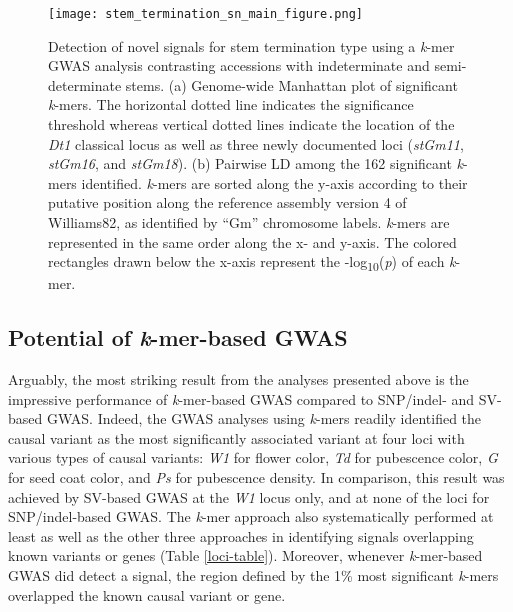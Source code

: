 \begin{figure}
	\centering
	\texttt{[image: stem\_termination\_sn\_main\_figure.png]}
	\caption[Detection of novel signals for stem termination type
	using a \textit{k}-mer GWAS analysis contrasting accessions with
	indeterminate and semi-determinate stems]{Detection of novel signals for stem termination type
	using a \textit{k}-mer GWAS analysis contrasting accessions with
	indeterminate and semi-determinate stems.
	(a) Genome-wide Manhattan plot of significant \textit{k}-mers.
	The horizontal dotted line indicates the significance threshold
	whereas vertical dotted lines indicate the location of the \textit{Dt1}
	classical locus as well as three newly documented loci (\textit{stGm11},
	\textit{stGm16}, and \textit{stGm18}).
	(b) Pairwise LD among the 162 significant \textit{k}-mers identified.
	\textit{k}-mers are sorted along the y-axis according to their
	putative position along the reference assembly version 4 of Williams82,
	as identified by ``Gm'' chromosome labels. \textit{k}-mers are
	represented in the same order along the x- and y-axis. The colored
	rectangles drawn below the x-axis represent the
	-log\textsubscript{10}(\textit{p}) of each \textit{k}-mer.}
	\label{stem-termination-main-figure}
\end{figure}

\subsection{Potential of \emph{k}-mer-based GWAS}
\label{sv-gwas-potential-kmers}

Arguably, the most striking result from the analyses presented above is the
impressive performance of \emph{k}-mer-based GWAS compared to SNP/indel- and
SV-based GWAS. Indeed, the GWAS analyses using \emph{k}-mers readily identified
the causal variant as the most significantly associated variant at four loci
with various types of causal variants: \emph{W1} for flower color, \emph{Td}
for pubescence color, \emph{G} for seed coat color, and \emph{Ps} for
pubescence density. In comparison, this result was achieved by SV-based GWAS
at the \textit{W1} locus only, and at none of the loci for SNP/indel-based GWAS.
The \textit{k}-mer approach also systematically performed at least as well as
the other three approaches in identifying signals overlapping known variants or genes
(Table \ref{loci-table}). Moreover, whenever \textit{k}-mer-based GWAS did
detect a signal, the region defined by the 1\% most significant \textit{k}-mers
overlapped the known causal variant or gene. 

